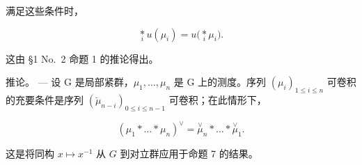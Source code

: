 满足这些条件时，

\[
\underset {i} {\ast} u (\mu_ {i}) = u \Big (\underset {i} {\ast} \mu_ {i} \Big).
\]

这由 §1 No.~2 命题 1 的推论得出。

推论。 --- 设 G 是局部紧群，\(\mu_{1},\ldots,\mu_{n}\) 是 G 上的测度。序列 \((\mu_{i})_{1\leqslant i\leqslant n}\) 可卷积的充要条件是序列 \((\breve{\mu}_{n-i})_{0\leqslant i\leqslant n-1}\) 可卷积；在此情形下，

\[
\left(\mu_ {1} * \dots * \mu_ {n}\right) ^ {\vee} = \stackrel {\vee} {\mu} _ {n} * \dots * \stackrel {\vee} {\mu} _ {1}.
\]

这是将同构 \(x \mapsto x^{-1}\) 从 \(G\) 到对立群应用于命题 7 的结果。

